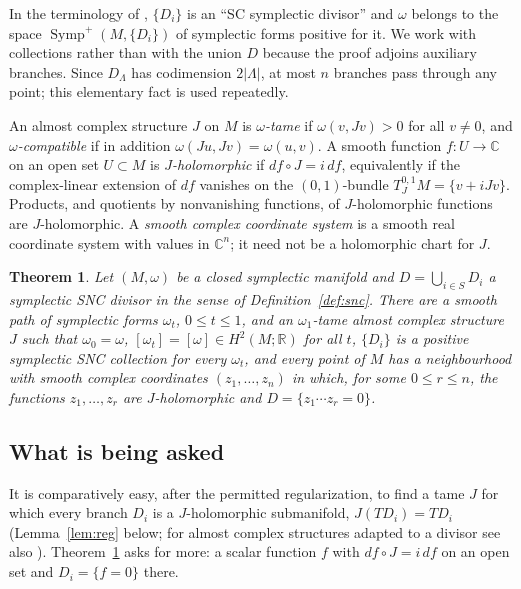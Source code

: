 \documentclass[11pt]{article}
\newtheorem{theorem}{Theorem}
\theoremstyle{remark}
\newcommand{\C}{\mathbb C}
\newcommand{\R}{\mathbb R}
\newcommand{\Symp}{\operatorname{Symp}}
\begin{document}
In the terminology of \cite{FMZ}, $\{D_i\}$ is an ``SC symplectic
divisor'' and $\omega$ belongs to the space $\Symp^+(M,\{D_i\})$ of
symplectic forms positive for it. We work with collections rather than
with the union $D$ because the proof adjoins auxiliary branches. Since
$D_\Lambda$ has codimension $2|\Lambda|$, at most $n$ branches pass
through any point; this elementary fact is used repeatedly.

An almost complex structure $J$ on $M$ is \emph{$\omega$-tame} if
$\omega(v,Jv)>0$ for all $v\neq0$, and \emph{$\omega$-compatible} if in
addition $\omega(Ju,Jv)=\omega(u,v)$. A smooth function $f\colon U\to\C$
on an open set $U\subset M$ is \emph{$J$-holomorphic} if
$df\circ J=i\,df$, equivalently if the complex-linear extension of $df$
vanishes on the $(0,1)$-bundle $T^{0,1}_JM=\{v+iJv\}$. Products, and
quotients by nonvanishing functions, of $J$-holomorphic functions are
$J$-holomorphic. A \emph{smooth complex coordinate system} is a smooth
real coordinate system with values in $\C^n$; it need not be a
holomorphic chart for $J$.


\begin{theorem}\label{thm:main}
Let $(M,\omega)$ be a closed symplectic manifold and $D=\bigcup_{i\in S}D_i$
a symplectic SNC divisor in the sense of Definition~\ref{def:snc}. There
are a smooth path of symplectic forms $\omega_t$, $0\le t\le1$, and an
$\omega_1$-tame almost complex structure $J$ such that $\omega_0=\omega$,
$[\omega_t]=[\omega]\in H^2(M;\R)$ for all $t$, $\{D_i\}$ is a positive
symplectic SNC collection for every $\omega_t$, and every point of $M$
has a neighbourhood with smooth complex coordinates $(z_1,\dots,z_n)$
in which, for some $0\le r\le n$, the functions $z_1,\dots,z_r$ are
$J$-holomorphic and $D=\{z_1\cdots z_r=0\}$.
\end{theorem}


\subsection*{What is being asked}

It is comparatively easy, after the permitted regularization, to find
a tame $J$ for which every branch $D_i$ is a $J$-holomorphic
submanifold, $J(TD_i)=TD_i$ (Lemma~\ref{lem:reg} below; for almost
complex structures adapted to a divisor see also \cite[Section 3]{FZ}).
Theorem~\ref{thm:main} asks for more: a scalar function $f$ with
$df\circ J=i\,df$ on an open set and $D_i=\{f=0\}$ there.
\end{document}
